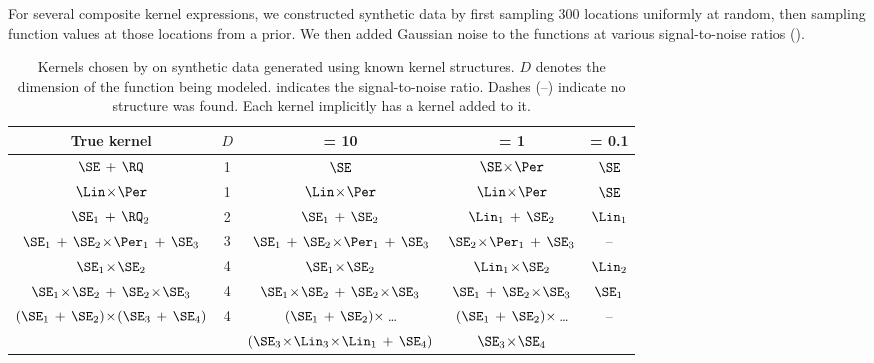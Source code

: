 For several composite kernel expressions, we constructed synthetic data by first sampling 300 locations uniformly at random, then sampling function values at those locations from a \gp{} prior.
We then added \iid Gaussian noise to the functions at various signal-to-noise ratios (\SNR{}).


\begin{table}[ht!]
\caption[Kernels chosen on synthetic data]
{
Kernels chosen by \procedurename{} on synthetic data generated using known kernel structures.
$D$ denotes the dimension of the function being modeled.
\SNR{} indicates the signal-to-noise ratio.
Dashes (--) indicate no structure was found.
Each kernel implicitly has a \kWN{} kernel added to it.
}
\label{tbl:synthetic}
\addtolength{\tabcolsep}{1pt}
\setlength\extrarowheight{2pt}
\begin{center}
{\small
\begin{tabular}{c c | c c c}
True kernel & $D$ & \SNR{} = 10 & \SNR{} = 1 & \hspace{-1cm} \SNR{} = 0.1 \\
\hline
$\SE \kernplus \RQ$        & 1 & $\SE$ & $\SE \kerntimes \Per$ & $\SE$ \\
$\Lin \kerntimes \Per$ & 1 & $\Lin \kerntimes \Per$ & $\Lin \kerntimes \Per$ & $\SE$ \\
$\SE_1 \kernplus \RQ_2$    & 2 & $\SE_1 \kernplus \SE_2$ & $\Lin_1 \kernplus \SE_2$ & $\Lin_1$ \\
$\SE_1 \kernplus \SE_2 \kerntimes \Per_1 \kernplus \SE_3$ & 3 & $\SE_1 \kernplus \SE_2 \kerntimes \Per_1 \kernplus \SE_3$ & $\SE_2 \kerntimes \Per_1 \kernplus \SE_3$ & -- \\
$\SE_1 \kerntimes \SE_2$ & 4 & $\SE_1 \kerntimes \SE_2$ & $\Lin_1 \kerntimes \SE_2$ & $\Lin_2$ \\
$\SE_1 \kerntimes \SE_2 \kernplus \SE_2 \kerntimes \SE_3$ & 4 & $\SE_1 \kerntimes \SE_2 \kernplus \SE_2 \kerntimes \SE_3$ & $\SE_1 \kernplus \SE_2 \kerntimes \SE_3$ & $\SE_1$ \\
\multirow{2}{*}{ $(\SE_1 \kernplus \SE_2) \kerntimes (\SE_3 \kernplus \SE_4)$ } & \multirow{2}{*}{4} & $(\SE_1 \kernplus \SE_2) \, \kerntimes$ \dots & $(\SE_1 \kernplus \SE_2) \, \kerntimes$ \dots & \multirow{2}{*}{--} \\
 & & $(\SE_3\kerntimes\Lin_3\kerntimes\Lin_1 \kernplus \SE_4)$ & $\SE_3 \kerntimes \SE_4$ &
\end{tabular}
}
\end{center}
\end{table}


